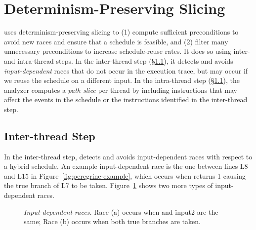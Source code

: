\section{Determinism-Preserving Slicing} \label{sec:peregrine-slice}

\peregrine uses determinism-preserving slicing to (1) compute sufficient
preconditions to avoid new races and ensure that a schedule is feasible,
and (2) filter many unnecessary preconditions to increase schedule-reuse
rates.  It does so using inter- and intra-thread steps.  In the
inter-thread step (\S\ref{sec:peregrine-interthread-slice}), it detects and avoids
\emph{input-dependent} races that do not occur in the execution trace, but
may occur if we reuse the schedule on a different input.
In the intra-thread step (\S\ref{sec:peregrine-interthread-slice}), the analyzer
computes a \emph{path slice} per thread by including instructions that may
affect the events in the schedule or the instructions identified in the
inter-thread step.


\subsection{Inter-thread Step} \label{sec:peregrine-interthread-slice}

In the inter-thread step, \peregrine detects and avoids input-dependent races
with respect to a hybrid schedule.  An example input-dependent race is the
one between lines L8 and L15 in Figure~\ref{fig:peregrine-example}, which occurs when
 returns 1 causing the true branch of L7 to be taken.
Figure~\ref{fig:peregrine-input-race-examples} shows two more types of input-dependent races.

\begin{figure}[b]
\vspace{-.1in}
\centering
{}
\begin{minipage}[b]{.225\textwidth}
\end{minipage}
\begin{minipage}[b]{.225\textwidth}
\end{minipage}
\vspace{-.1in}
\caption{{\em Input-dependent races.} Race (a) occurs when
   and \v{input2} are the same; Race (b) occurs when
  both true branches are taken.} \label{fig:peregrine-input-race-examples}
\end{figure}


